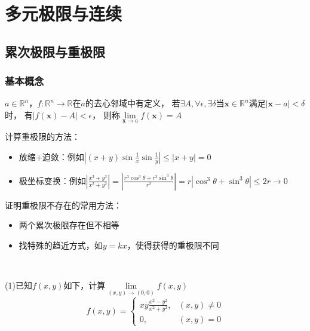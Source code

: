 

\chapter{多元极限与连续}

\section{累次极限与重极限}

\subsection{基本概念}

\begin{definition}[重极限]
  $a \in \mathbb{R}^n$，$f: \mathbb{R}^n \rightarrow \mathbb{R}$在$a$的去心邻域中有定义，
  若$\exists A, \forall \epsilon, \exists \delta$当$\mathbf{x} \in \mathbb{R}^n$满足$|\mathbf{x} - a| < \delta$时，
  有$|f(\mathbf{x}) - A| < \epsilon$，
  则称$\lim \limits _{\mathbf{x} \rightarrow a}f(\mathbf{x}) = A$
\end{definition}

\begin{note}
  计算重极限的方法：
  \begin{itemize}
  \item 放缩+迫敛：例如$\left| (x+y) \sin \frac{1}{x } \sin \frac{1}{y} \right| \leq |x+y| = 0$
  \item 极坐标变换：例如$\left| \frac{x^3 + y^3}{x^2 + y^2} \right| = \left| \frac{r^3\cos^3\theta + r^3 \sin^3 \theta}{r^2} \right| = r|\cos^3 \theta + \sin^3 \theta| \leq 2r \rightarrow 0$
  \end{itemize}
\end{note}

\begin{note}
  证明重极限不存在的常用方法：
  \begin{itemize}
  \item 两个累次极限存在但不相等
  \item 找特殊的趋近方式，如$y = kx$，使得获得的重极限不同
  \end{itemize}
\end{note}

~

\begin{exercise}[重极限的计算]
  (1)已知$f(x,y)$如下，计算$\lim \limits _{(x,y) \rightarrow (0,0)}f(x,y)$
  \begin{equation*}
    f(x,y) =
    \begin{cases}
      xy \frac{x^2 - y^2}{x^2 + y^2}, &(x,y) \neq 0\\
      0, &(x,y) = 0
    \end{cases}
  \end{equation*}
\end{exercise}

